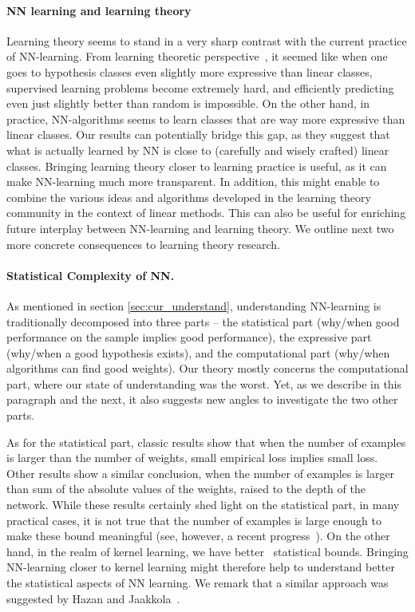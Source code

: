 \paragraph{NN learning and learning theory} Learning theory seems to stand in a very sharp contrast with the current practice of NN-learning. From learning theoretic perspective~\cite{KlivansSh06, daniely2013average, danielySh2014, daniely2015complexity}, it seemed like when one goes to hypothesis classes even slightly more expressive than linear classes, supervised learning problems become extremely hard, and efficiently predicting even just slightly better than random is impossible. On the other hand, in practice, NN-algorithms seems to learn classes that are way more expressive than linear classes. Our results can potentially bridge this gap, as they suggest that what is actually learned by NN is close to (carefully and wisely crafted) linear classes.
Bringing learning theory closer to learning practice is useful, as it can make NN-learning much more transparent. In addition, this might enable to combine the various ideas and algorithms developed in the learning theory community in the context of linear methods. This can also be useful for enriching future interplay between NN-learning and learning theory. We outline next two more concrete consequences to learning theory research.


\paragraph{Statistical Complexity of NN.} As mentioned in section \ref{sec:cur_understand}, understanding NN-learning is traditionally decomposed into three parts -- the statistical part (why/when good performance  on the sample implies good performance), the expressive part (why/when a good hypothesis exists), and the computational part (why/when algorithms can find good weights). Our theory mostly concerns the computational part, where our state of understanding was the worst. Yet, as we describe in this paragraph and the next, it also suggests new angles to investigate the two other parts.

As for the statistical part, classic results \cite{BaumHa89} show that when the number of examples is larger than the number of weights, small empirical loss implies small loss. Other results \cite{Bartlett98, behnam2015norm} show a similar conclusion, when the number of examples is larger than sum of the absolute values of the weights, raised to the depth of the network.
While these results certainly shed light on the statistical part, in many practical cases, it is not true that the number of examples is large enough to make these bound meaningful (see, however, a recent progress~\cite{hardt2015train}). On the other hand, in the realm of kernel learning, we have better~\cite{BoucheronBoLu05, BartlettMe02} statistical bounds. Bringing NN-learning closer to kernel learning might therefore help to understand better the statistical aspects of NN learning. We remark that a similar approach was suggested by Hazan and Jaakkola~\cite{hazan2015steps}.


